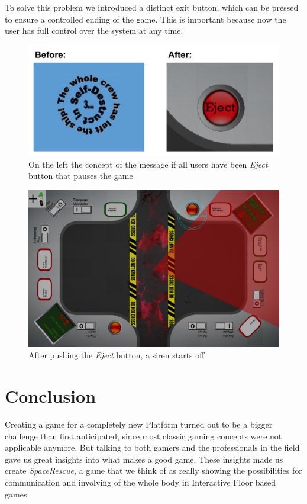 \documentclass{sigchi}
\begin{document}
To solve this problem we introduced a distinct exit button, which can be pressed to ensure a controlled ending of the game. This is important because now the user has full control over the system at any time. 


\begin{figure}[H]
\centering
\includegraphics[width=0.99\columnwidth]{ejectbutton}
\caption{On the left the concept of the message if all users have been \textit{Eject} button that pauses the game}
\label{fig:gamingArea}
\end{figure}


\begin{figure}[H]
\centering
\includegraphics[width=0.99\columnwidth]{ejecting}
\caption{After pushing the \textit{Eject} button, a siren starts off}
\label{fig:gamingArea}
\end{figure}

\section{Conclusion}
\vspace{1mm}

Creating a game for a completely new Platform turned out to be a bigger challenge than first anticipated, since most classic gaming concepts were not applicable anymore. But talking to both gamers and the professionals in the field gave us great insights into what makes a good game. These insights made us create \textit{SpaceRescue}, a game that we think of as really showing the possibilities for communication and involving of the whole body in Interactive Floor based games. \newline





\balance
\end{document}

